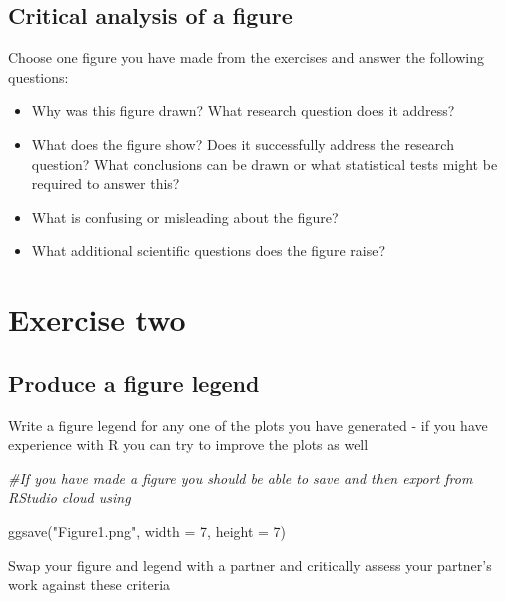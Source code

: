 \documentclass[
]{book}
\newenvironment{Shaded}{\begin{snugshade}}{\end{snugshade}}
\newcommand{\AttributeTok}[1]{\textcolor[rgb]{0.77,0.63,0.00}{#1}}
\newcommand{\CommentTok}[1]{\textcolor[rgb]{0.56,0.35,0.01}{\textit{#1}}}
\newcommand{\DecValTok}[1]{\textcolor[rgb]{0.00,0.00,0.81}{#1}}
\newcommand{\FunctionTok}[1]{\textcolor[rgb]{0.00,0.00,0.00}{#1}}
\newcommand{\NormalTok}[1]{#1}
\newcommand{\StringTok}[1]{\textcolor[rgb]{0.31,0.60,0.02}{#1}}
\begin{document}
\hypertarget{critical-analysis-of-a-figure}{%
\subsection{Critical analysis of a figure}\label{critical-analysis-of-a-figure}}

Choose one figure you have made from the exercises and answer the following questions:

\begin{itemize}
\item
  Why was this figure drawn? What research question does it address?
\item
  What does the figure show? Does it successfully address the research question? What conclusions can be drawn or what statistical tests might be required to answer this?
\item
  What is confusing or misleading about the figure?
\item
  What additional scientific questions does the figure raise?
\end{itemize}

\hypertarget{exercise-two}{%
\section{Exercise two}\label{exercise-two}}

\hypertarget{produce-a-figure-legend}{%
\subsection{Produce a figure legend}\label{produce-a-figure-legend}}

Write a figure legend for any one of the plots you have generated - if you have experience with R you can try to improve the plots as well

\begin{Shaded}
\begin{Highlighting}[]
\CommentTok{\#If you have made a figure you should be able to save and then export from RStudio cloud using}

\FunctionTok{ggsave}\NormalTok{(}\StringTok{"Figure1.png"}\NormalTok{, }\AttributeTok{width =} \DecValTok{7}\NormalTok{, }\AttributeTok{height =} \DecValTok{7}\NormalTok{)}
\end{Highlighting}
\end{Shaded}

Swap your figure and legend with a partner and critically assess your partner's work against these criteria
\end{document}
